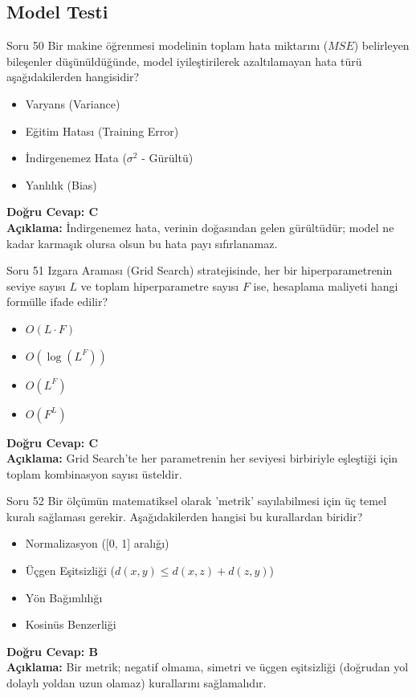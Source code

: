 \documentclass[12pt,a4paper]{article}
\begin{document}
\newpage
\subsection{Model Testi}

\begin{testcard}{Soru 50}
    Bir makine öğrenmesi modelinin toplam hata miktarını ($MSE$) belirleyen bileşenler düşünüldüğünde, model iyileştirilerek azaltılamayan hata türü aşağıdakilerden hangisidir?
    \begin{itemize}
        \item[A)] Varyans (Variance)
        \item[B)] Eğitim Hatası (Training Error)
        \item[C)] İndirgenemez Hata ($\sigma^2$ - Gürültü)
        \item[D)] Yanlılık (Bias)
    \end{itemize}
    \tcblower
    \textbf{Doğru Cevap: C} \\
    \textbf{Açıklama:} İndirgenemez hata, verinin doğasından gelen gürültüdür; model ne kadar karmaşık olursa olsun bu hata payı sıfırlanamaz.
\end{testcard}

\begin{testcard}{Soru 51}
    Izgara Araması (Grid Search) stratejisinde, her bir hiperparametrenin seviye sayısı $L$ ve toplam hiperparametre sayısı $F$ ise, hesaplama maliyeti hangi formülle ifade edilir?
    \begin{itemize}
        \item[A)] $O(L \cdot F)$
        \item[B)] $O(\log(L^F))$
        \item[C)] $O(L^F)$
        \item[D)] $O(F^L)$
    \end{itemize}
    \tcblower
    \textbf{Doğru Cevap: C} \\
    \textbf{Açıklama:} Grid Search'te her parametrenin her seviyesi birbiriyle eşleştiği için toplam kombinasyon sayısı üsteldir.
\end{testcard}

\begin{testcard}{Soru 52}
    Bir ölçümün matematiksel olarak 'metrik' sayılabilmesi için üç temel kuralı sağlaması gerekir. Aşağıdakilerden hangisi bu kurallardan biridir?
    \begin{itemize}
        \item[A)] Normalizasyon ([0, 1] aralığı)
        \item[B)] Üçgen Eşitsizliği ($d(x, y) \leq d(x, z) + d(z, y)$)
        \item[C)] Yön Bağımlılığı
        \item[D)] Kosinüs Benzerliği
    \end{itemize}
    \tcblower
    \textbf{Doğru Cevap: B} \\
    \textbf{Açıklama:} Bir metrik; negatif olmama, simetri ve üçgen eşitsizliği (doğrudan yol dolaylı yoldan uzun olamaz) kurallarını sağlamalıdır.
\end{testcard}
\end{document}
